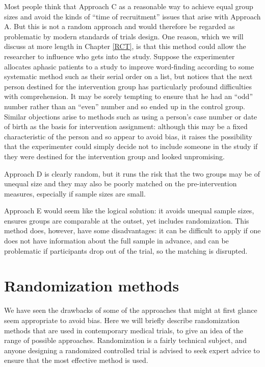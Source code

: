 \documentclass{krantz}
\begin{document}
Most people think that Approach C as a reasonable way to achieve equal group sizes and avoid the kinds of ``time of recruitment'' issues that arise with Approach A. But this is not a random approach and would therefore be regarded as problematic by modern standards of trials design. One reason, which we will discuss at more length in Chapter \ref{RCT}, is that this method could allow the researcher to influence who gets into the study. Suppose the experimenter allocates aphasic patients to a study to improve word-finding according to some systematic method such as their serial order on a list, but notices that the next person destined for the intervention group has particularly profound difficulties with comprehension. It may be sorely tempting to ensure that he had an ``odd'' number rather than an ``even'' number and so ended up in the control group. Similar objections arise to methods such as using a person's case number or date of birth as the basis for intervention assignment: although this may be a fixed characteristic of the person and so appear to avoid bias, it raises the possibility that the experimenter could simply decide not to include someone in the study if they were destined for the intervention group and looked unpromising.

Approach D is clearly random, but it runs the risk that the two groups may be of unequal size and they may also be poorly matched on the pre-intervention measures, especially if sample sizes are small.

Approach E would seem like the logical solution: it avoids unequal sample sizes, ensures groups are comparable at the outset, yet includes randomization. This method does, however, have some disadvantages: it can be difficult to apply if one does not have information about the full sample in advance, and can be problematic if participants drop out of the trial, so the matching is disrupted.

\hypertarget{randomization-methods}{%
\section{Randomization methods}\label{randomization-methods}}

We have seen the drawbacks of some of the approaches that might at first glance seem appropriate to avoid bias. Here we will briefly describe randomization methods that are used in contemporary medical trials, to give an idea of the range of possible approaches. Randomization is a fairly technical subject, and anyone designing a randomized controlled trial is advised to seek expert advice to ensure that the most effective method is used.
\end{document}
